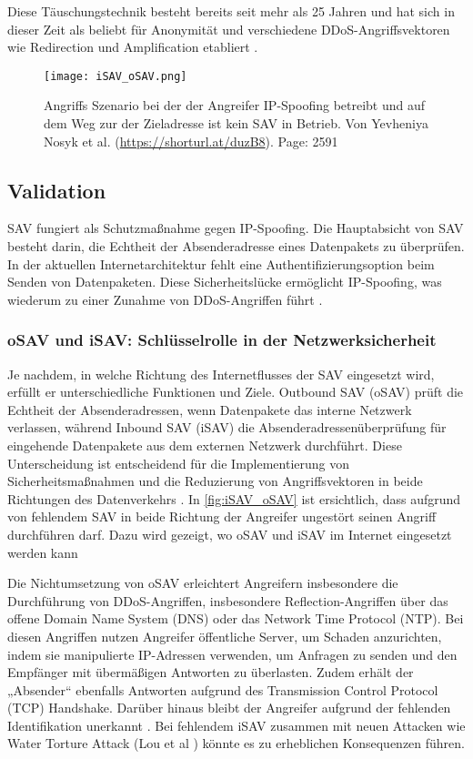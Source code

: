 \documentclass[sigplan,screen]{acmart}
\begin{document}
Diese Täuschungstechnik besteht bereits seit mehr als 25 Jahren und hat sich in dieser Zeit als beliebt für Anonymität und verschiedene DDoS-Angriffsvektoren wie Redirection und Amplification etabliert \cite{manrs01}.

\begin{figure}[h]
  \centering
  \texttt{[image: iSAV\_oSAV.png]}
  \caption{Angriffs Szenario bei der der Angreifer IP-Spoofing betreibt und auf dem Weg zur der Zieladresse ist kein SAV in Betrieb. Von Yevheniya Nosyk et al. (\url{https://shorturl.at/duzB8}). Page: 2591}
  \label{fig:iSAV_oSAV}
\end{figure}

\subsection{Validation}
SAV fungiert als Schutzmaßnahme gegen IP-Spoofing. Die Hauptabsicht von SAV besteht darin, die Echtheit der Absenderadresse eines Datenpakets zu überprüfen. In der aktuellen Internetarchitektur fehlt eine Authentifizierungsoption beim Senden von Datenpaketen. Diese Sicherheitslücke ermöglicht IP-Spoofing, was wiederum zu einer Zunahme von DDoS-Angriffen führt \cite{Hal01}.

\subsubsection{oSAV und iSAV: Schlüsselrolle in der Netzwerksicherheit}
Je nachdem, in welche Richtung des Internetflusses der SAV eingesetzt wird, erfüllt er unterschiedliche Funktionen und Ziele. Outbound SAV (oSAV) prüft die Echtheit der Absenderadressen, wenn Datenpakete das interne Netzwerk verlassen, während Inbound SAV (iSAV) die Absenderadressenüberprüfung für eingehende Datenpakete aus dem externen Netzwerk durchführt. Diese Unterscheidung ist entscheidend für die Implementierung von Sicherheitsmaßnahmen und die Reduzierung von Angriffsvektoren in beide Richtungen des Datenverkehrs \cite{Hal01}. 
In \autoref{fig:iSAV_oSAV} ist ersichtlich, dass aufgrund von fehlendem SAV in beide Richtung der Angreifer ungestört seinen Angriff durchführen darf. Dazu wird gezeigt, wo oSAV und iSAV im Internet eingesetzt werden kann

Die Nichtumsetzung von oSAV erleichtert Angreifern insbesondere die Durchführung von DDoS-Angriffen, insbesondere Reflection-Angriffen über das offene Domain Name System (DNS) oder das Network Time Protocol (NTP). Bei diesen Angriffen nutzen Angreifer öffentliche Server, um Schaden anzurichten, indem sie manipulierte IP-Adressen verwenden, um Anfragen zu senden und den Empfänger mit übermäßigen Antworten zu überlasten. Zudem erhält der „Absender“ ebenfalls Antworten aufgrund des Transmission Control Protocol (TCP) Handshake. Darüber hinaus bleibt der Angreifer aufgrund der fehlenden Identifikation unerkannt \cite{manrs01} \cite{Hal01} \cite{Ingress01}. Bei fehlendem iSAV zusammen mit neuen Attacken wie Water Torture Attack (Lou et al \cite{Lou01}) könnte es zu erheblichen Konsequenzen führen.
\end{document}
